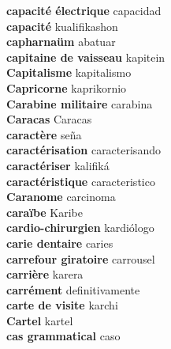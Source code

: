 \textbf{ capacité électrique  } capacidad \\
\textbf{ capacité  } kualifikashon \\
\textbf{ capharnaüm  } abatuar \\
\textbf{ capitaine de vaisseau  } kapitein \\
\textbf{ Capitalisme  } kapitalismo \\
\textbf{ Capricorne  } kaprikornio \\
\textbf{ Carabine militaire  } carabina \\
\textbf{ Caracas  } Caracas \\
\textbf{ caractère  } seña \\
\textbf{ caractérisation  } caracterisando \\
\textbf{ caractériser  } kalifiká \\
\textbf{ caractéristique  } caracteristico \\
\textbf{ Caranome  } carcinoma \\
\textbf{ caraïbe  } Karibe \\
\textbf{ cardio-chirurgien  } kardiólogo \\
\textbf{ carie dentaire  } caries \\
\textbf{ carrefour giratoire  } carrousel \\
\textbf{ carrière  } karera \\
\textbf{ carrément  } definitivamente \\
\textbf{ carte de visite  } karchi \\
\textbf{ Cartel  } kartel \\
\textbf{ cas grammatical  } caso \\
